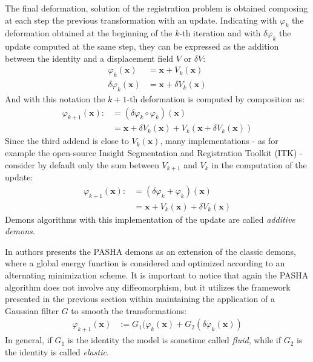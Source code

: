 The final deformation, solution of the registration problem is obtained composing at each step the previous transformation with an update. Indicating with $\varphi_{k}$ the deformation obtained at the beginning of the $k$-th iteration and with $\delta \varphi_{k}$ the update computed at the same step, they can be expressed as the addition between the identity and a displacement field $V$ or $\delta V$:
\begin{align*}
	\varphi_{k}(\mathbf{x}) &= \mathbf{x} + V_{k}(\mathbf{x}) \\ 
	\delta \varphi_{k}(\mathbf{x}) &= \mathbf{x} + \delta V_{k}(\mathbf{x}) 
\end{align*}
And with this notation the $k+1$-th deformation is computed by composition as:
\begin{align*}
\varphi_{k+1}(\mathbf{x})  :&= (\delta \varphi_{k}\circ \varphi_{k})(\mathbf{x}) \\
&= \mathbf{x} + \delta V_{k}(\mathbf{x}) + V_{k}(\mathbf{x} + \delta V_{k}(\mathbf{x}))
\end{align*}
Since the third addend is close to $V_{k}(\mathbf{x})$, many implementations - as for example the open-source Insight Segmentation and Registration Toolkit (ITK) \cite{yoo2002engineering} - consider by default only the sum between 
$ V_{k+1}$ and $V_{k}$ in the computation of the update:
\begin{align*}
\varphi_{k+1}(\mathbf{x})  :&= (\delta \varphi_{k} + \varphi_{k})(\mathbf{x}) \\
&= \mathbf{x} + V_{k}(\mathbf{x}) + \delta V_{k}(\mathbf{x})
\end{align*}
Demons algorithms with this implementation of the update are called \emph{additive demons}.

In \cite{cachier2003iconic} authors presents the PASHA demons as an extension of the classic demons, where a global energy function is considered and optimized according to an alternating minimization scheme. 
It is important to notice that again the PASHA algorithm does not involve any diffeomorphism, but it utilizes the framework presented in the previous section within maintaining the application of a Gaussian filter $G$ to smooth the transformations:
\begin{align*}
\varphi_{k+1}(\mathbf{x})  &:= G_{1}(\varphi_{k}(\mathbf{x}) + G_{2}(\delta \varphi_{k}(\mathbf{x}))
\end{align*}
In general, if $G_{1}$ is the identity the model is sometime called \emph{fluid}, while if $G_{2}$ is the identity is called \emph{elastic}.

